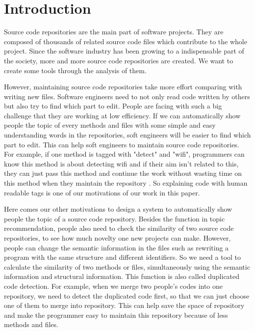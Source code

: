 \section{Introduction}
\label{sec:intro}


Source code repositories are the main part of software projects.
They are composed of thousands of related source code files which contribute to the whole project.
Since the software industry has been growing to a indispensable part of the society,
more and more source code repositories are created. We want to create some tools through the analysis
of them.



However, maintaining source code repositories take more effort comparing with writing new files.
Software engineers need to not only read code written by others but also try to find which part to edit.
People are facing with such a big challenge that they are working at low efficiency.
If we can automatically show people the topic of every methods and files with some simple and easy understanding words in the repositories, soft engineers will be easier to find which part to edit. This can help soft engineers to maintain source code repositories. For example, if one method is tagged with "detect" and "wifi", programmers can know this method is about detecting wifi and if their aim isn't related to this, they can just pass this method and continue the work without wasting time on this method when they maintain the repository .
So explaining code with human readable tags is one of our motivations of our work in this paper.


Here comes our other motivations to design a system to automatically show people the topic of a source code repository.
Besides the function in topic recommendation, people also need to check the similarity of two source code repositories,
to see how much novelty one new projects can make. However, people can change the semantic information in the
files such as rewriting a program with the same structure and different identifiers. So we need a tool to calculate
the similarity of two methods or files, simultaneously using the semantic information and structural information. This function is also called duplicated code detection. For example, when we merge two people's codes into one repository, we need to detect the duplicated code first, so that we can just choose one of them to merge into repository. This can help save the space of repository and make the programmer easy to maintain this repository because of less methods and files.

